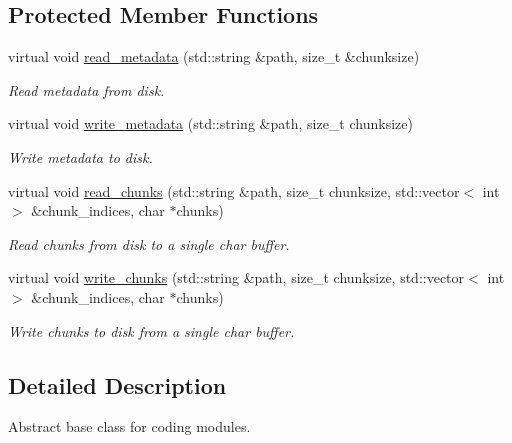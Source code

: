 \subsection*{\-Protected \-Member \-Functions}
\begin{DoxyCompactItemize}
\item 
virtual void \hyperlink{classCoding_a8648d12606143d64c1f498a570f2d2b8}{read\-\_\-metadata} (std\-::string \&path, size\-\_\-t \&chunksize)
\begin{DoxyCompactList}\small\item\em \-Read metadata from disk. \end{DoxyCompactList}\item 
virtual void \hyperlink{classCoding_a7b2f6c2f1c1051647a5d1269c9d19f3b}{write\-\_\-metadata} (std\-::string \&path, size\-\_\-t chunksize)
\begin{DoxyCompactList}\small\item\em \-Write metadata to disk. \end{DoxyCompactList}\item 
virtual void \hyperlink{classCoding_a73ebe52a221e8cd02054c4290b75e70c}{read\-\_\-chunks} (std\-::string \&path, size\-\_\-t chunksize, std\-::vector$<$ int $>$ \&chunk\-\_\-indices, char $\ast$chunks)
\begin{DoxyCompactList}\small\item\em \-Read chunks from disk to a single char buffer. \end{DoxyCompactList}\item 
virtual void \hyperlink{classCoding_a1c95e3e821ec84d4b056cf3fd662a535}{write\-\_\-chunks} (std\-::string \&path, size\-\_\-t chunksize, std\-::vector$<$ int $>$ \&chunk\-\_\-indices, char $\ast$chunks)
\begin{DoxyCompactList}\small\item\em \-Write chunks to disk from a single char buffer. \end{DoxyCompactList}\end{DoxyCompactItemize}


\subsection{\-Detailed \-Description}
\-Abstract base class for coding modules. 



